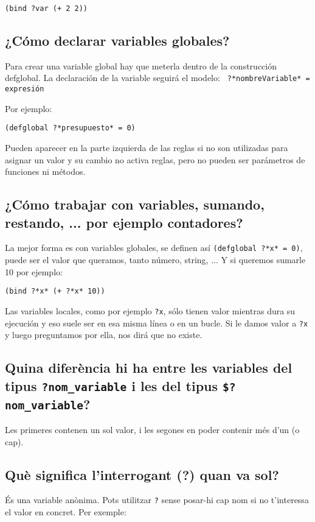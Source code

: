 \documentclass[11pt,svgnames]{scrbook}
\begin{document}
\texttt{(bind ?var (+ 2 2)) }

\subsection{¿Cómo declarar variables globales?}

Para crear una variable global hay que meterla dentro de la construcción defglobal. La declaración de la variable seguirá el modelo:   \texttt{ ?*nombreVariable* = expresión}

Por ejemplo:
\medskip

\texttt{(defglobal ?*presupuesto* = 0)}
\medskip

Pueden aparecer en la parte izquierda de las reglas si no son utilizadas para asignar un valor y su cambio no activa reglas, pero no pueden ser parámetros de funciones ni métodos.

\subsection{¿Cómo trabajar con variables, sumando, restando, ... por ejemplo
contadores?}

La mejor forma es con variables globales, se definen así
\texttt{(defglobal ?*x* = 0)}, puede ser el valor que queramos, tanto número,
string, ...
Y si queremos sumarle 10 por ejemplo:
\medskip

\texttt{(bind ?*x* (+ ?*x* 10))}
\medskip

Las variables locales, como por ejemplo \texttt{?x}, sólo tienen valor mientras
dura su ejecución y eso suele ser en esa misma línea o en un bucle. Si le damos
valor a \texttt{?x} y luego preguntamos por ella, nos dirá que no existe.

\subsection{Quina diferència hi ha entre les variables del tipus
{\tt ?nom\_variable} i les del tipus {\tt \$?nom\_variable}?}

Les primeres contenen un sol valor, i les segones en poder contenir més d'un (o
cap).


\subsection{Què significa l'interrogant (?) quan va sol?}

És una variable anònima. Pots utilitzar \texttt{?} sense posar-hi cap nom si
no t'interessa el valor en concret.
Per exemple:
\medskip
\end{document}
